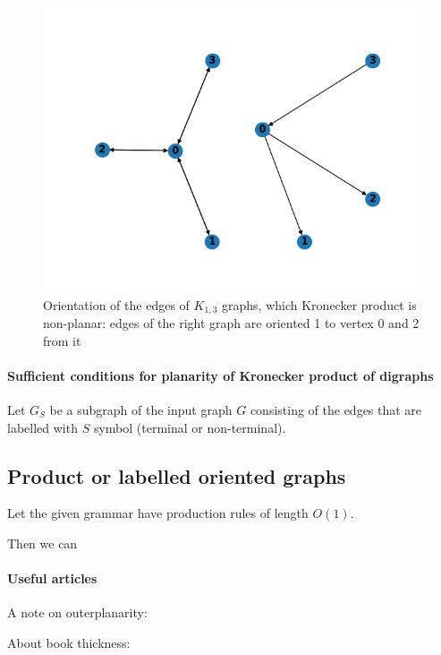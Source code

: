 \begin{figure}[h]

  \begin{center}  
  \includegraphics[scale = 0.3]{k13_21.png}
  \end{center}

  \caption{Orientation of the edges of $K_{1, 3}$ graphs, which Kronecker product is non-planar: edges of the right graph are oriented 1 to vertex $0$ and 2 from it}

  \label{fig:k13_21}

\end{figure}

\paragraph{Sufficient conditions for planarity of Kronecker product of digraphs}

Let $G_S$ be a subgraph of the input graph $G$ consisting of the edges that are labelled with $S$ symbol (terminal or non-terminal).




\subsection{Product or labelled oriented graphs}

Let the given grammar have production rules of length $O(1)$.

Then we can 


\paragraph{Useful articles}

A note on outerplanarity: ~\cite{jha1993note}

About book thickness: ~\cite{bernhart1979book}




